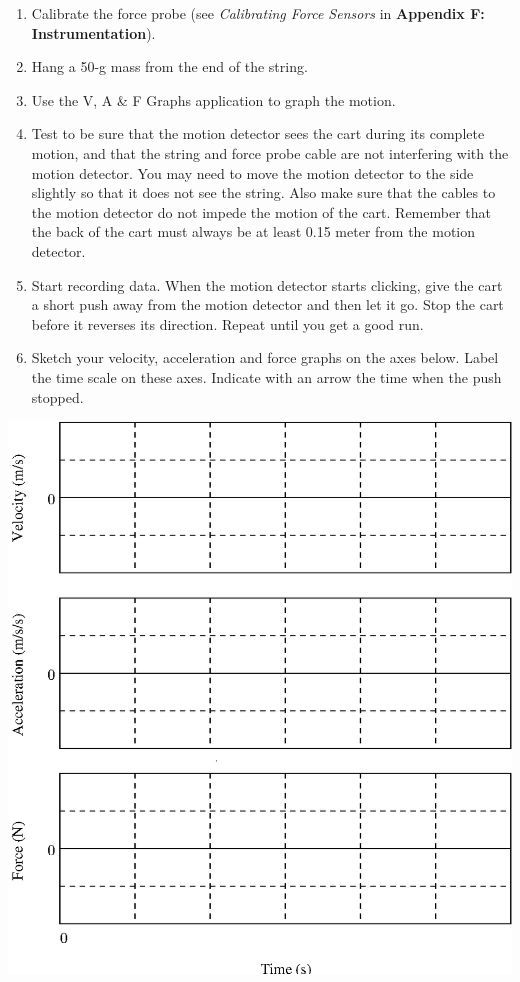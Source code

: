 \begin{enumerate}
\item Calibrate the force probe (see \textit{Calibrating Force Sensors} in \textbf{Appendix F: Instrumentation}).
\item Hang a 50-g mass from the end of the string.
\item Use the V, A \& F Graphs application to graph the motion. 
\item Test to be sure that the motion detector sees the cart during its complete motion,
and that the string and force probe cable are not interfering with the motion
detector. You may need to move the motion detector to the side slightly so that
it does not see the string. Also make sure that the cables to the motion detector
do not impede the motion of the cart. Remember that the back of the cart must
always be at least 0.15 meter from the motion detector. 
\item Start recording data. When the motion detector starts clicking, give the cart
a short push away from the motion detector and then let it go. Stop the cart
before it reverses its direction. Repeat until you get a good run. 
\item Sketch your velocity, acceleration and force graphs on the axes below. Label
the time scale on these axes. Indicate with an arrow the time when the push
stopped.
\end{enumerate}
\vspace{0.3cm}
{\par\centering \includegraphics{force2_fig4.eps} \par}
\vspace{0.3cm}

